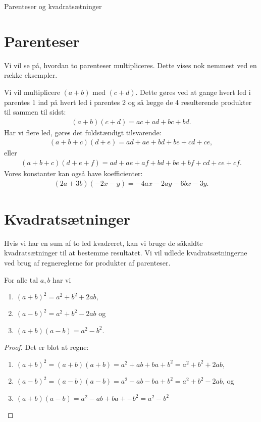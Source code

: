 \begin{center}
\Huge
Parenteser og kvadratsætninger
\end{center}
\section*{Parenteser}
Vi vil se på, hvordan to parenteser multipliceres. Dette vises nok nemmest ved en række eksempler.
\begin{exa}
Vi vil multiplicere $(a+b)$ med $(c+d)$. Dette gøres ved at gange hvert led i parentes 1 ind på hvert led i parentes 2 og så lægge de 4 resulterende produkter til sammen til sidst:
\begin{align*}
(a+b)(c+d) = ac+ad+bc+bd.
\end{align*}
Har vi flere led, gøres det fuldstændigt tilsvarende:
\begin{align*}
(a+b+c)(d+e) = ad+ae+bd+be+cd+ce,
\end{align*}
eller 
\begin{align*}
(a+b+c)(d+e+f) = ad+ae+af+bd+be+bf+cd+ce+cf.
\end{align*}
Vores konstanter kan også have koefficienter:
\begin{align*}
(2a+3b)(-2x-y) = -4ax-2ay-6bx-3y.
\end{align*}
\end{exa}
\section*{Kvadratsætninger}
Hvis vi har en sum af to led kvadreret, kan vi bruge de såkaldte kvadratsætninger til at bestemme resultatet. Vi vil udlede kvadratsætningerne ved brug af regnereglerne for produkter af parenteser.
\begin{setn}
For alle tal $a,b$ har vi
\begin{enumerate}[label=\roman*)]
\item $(a+b)^2 = a^2+b^2+2ab,$
\item $(a-b)^2 = a^2+b^2-2ab$ og 
\item $(a+b)(a-b) = a^2-b^2$.
\end{enumerate}
\end{setn}
\begin{proof}
Det er blot at regne:

\begin{enumerate}[label=$\roman*)$]
\item $(a+b)^2 = (a+b)(a+b)=a^2+ab+ba+b^2=a^2+b^2+2ab$,
\item $(a-b)^2 = (a-b)(a-b) = a^2-ab-ba+b^2 = a^2+b^2-2ab$, og
\item $(a+b)(a-b) = a^2-ab+ba+-b^2 = a^2-b^2$ 
\end{enumerate}
\end{proof}

